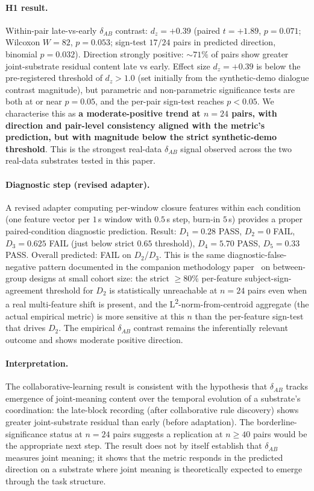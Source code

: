 \documentclass[11pt,a4paper]{article}
\begin{document}
\paragraph{H1 result.} Within-pair late-vs-early $\delta_{AB}$ contrast: $d_z = +0.39$ (paired $t = +1.89$, $p = 0.071$; Wilcoxon $W = 82$, $p = 0.053$; sign-test $17/24$ pairs in predicted direction, binomial $p = 0.032$). Direction strongly positive: $\sim 71\%$ of pairs show greater joint-substrate residual content late vs early. Effect size $d_z = +0.39$ is below the pre-registered threshold of $d_z > 1.0$ (set initially from the synthetic-demo dialogue contrast magnitude), but parametric and non-parametric significance tests are both at or near $p = 0.05$, and the per-pair sign-test reaches $p < 0.05$. We characterise this as \textbf{a moderate-positive trend at $n = 24$ pairs, with direction and pair-level consistency aligned with the metric's prediction, but with magnitude below the strict synthetic-demo threshold}. This is the strongest real-data $\delta_{AB}$ signal observed across the two real-data substrates tested in this paper.

\paragraph{Diagnostic step (revised adapter).} A revised adapter computing per-window closure features within each condition (one feature vector per $1$\,s window with $0.5$\,s step, burn-in $5$\,s) provides a proper paired-condition diagnostic prediction. Result: $D_1 = 0.28$ PASS, $D_2 = 0$ FAIL, $D_3 = 0.625$ FAIL (just below strict $0.65$ threshold), $D_4 = 5.70$ PASS, $D_5 = 0.33$ PASS. Overall predicted: FAIL on $D_2$/$D_3$. This is the same diagnostic-false-negative pattern documented in the companion methodology paper~\citep{SmartClosureDistance} on between-group designs at small cohort size: the strict $\geq 80\%$ per-feature subject-sign-agreement threshold for $D_2$ is statistically unreachable at $n = 24$ pairs even when a real multi-feature shift is present, and the L\textsuperscript{2}-norm-from-centroid aggregate (the actual empirical metric) is more sensitive at this $n$ than the per-feature sign-test that drives $D_2$. The empirical $\delta_{AB}$ contrast remains the inferentially relevant outcome and shows moderate positive direction.

\paragraph{Interpretation.} The collaborative-learning result is consistent with the hypothesis that $\delta_{AB}$ tracks emergence of joint-meaning content over the temporal evolution of a substrate's coordination: the late-block recording (after collaborative rule discovery) shows greater joint-substrate residual than early (before adaptation). The borderline-significance status at $n = 24$ pairs suggests a replication at $n \geq 40$ pairs would be the appropriate next step. The result does not by itself establish that $\delta_{AB}$ measures joint meaning; it shows that the metric responds in the predicted direction on a substrate where joint meaning is theoretically expected to emerge through the task structure.
\end{document}
